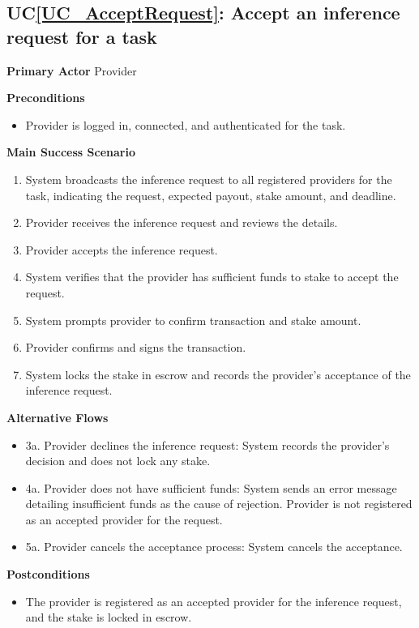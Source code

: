 \documentclass[12pt]{article}
\newcounter{ucnum} %
\newcommand{\ucref}[1]{UC\ref{#1}}
\begin{document}
 \label{UC_AcceptRequest}
\subsection{\ucref{UC_AcceptRequest}: Accept an inference request for a task}

\textbf{Primary Actor}
Provider

\textbf{Preconditions}
\begin{itemize}
\item Provider is logged in, connected, and authenticated for the task.
\end{itemize}

\textbf{Main Success Scenario}
\begin{enumerate}
\item System broadcasts the inference request to all registered providers for the task, indicating the request, expected payout, stake amount, and deadline.
\item Provider receives the inference request and reviews the details.
\item Provider accepts the inference request.
\item System verifies that the provider has sufficient funds to stake to accept the request.
\item System prompts provider to confirm transaction and stake amount.
\item Provider confirms and signs the transaction.
\item System locks the stake in escrow and records the provider's acceptance of the inference request.
\end{enumerate}

\textbf{Alternative Flows}
\begin{itemize}
\item 3a. Provider declines the inference request: System records the provider's decision and does not lock any stake.
\item 4a. Provider does not have sufficient funds: System sends an error message detailing insufficient funds as the cause of rejection. Provider is not registered as an accepted provider for the request.
\item 5a. Provider cancels the acceptance process: System cancels the acceptance.
\end{itemize}

\textbf{Postconditions}
\begin{itemize}
\item The provider is registered as an accepted provider for the inference request, and the stake is locked in escrow.
\end{itemize}
\end{document}
